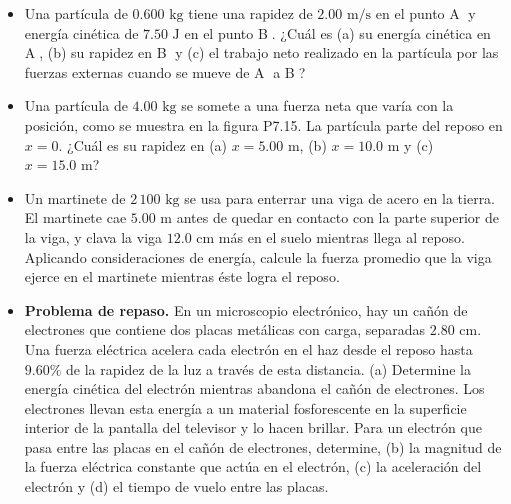 \documentclass[11pt,a4paper]{article}
\begin{document}
\begin{itemize}
    \item[\textbf{21.}] Una partícula de $0.600 \text{ kg}$ tiene una rapidez de $2.00 \text{ m/s}$ en el punto \textcircled{A} y energía cinética de $7.50 \text{ J}$ en el punto \textcircled{B}. ¿Cuál es (a) su energía cinética en \textcircled{A}, (b) su rapidez en \textcircled{B} y (c) el trabajo neto realizado en la partícula por las fuerzas externas cuando se mueve de \textcircled{A} a \textcircled{B}?
    \vspace*{6cm}

    \item[\textbf{22.}] Una partícula de $4.00 \text{ kg}$ se somete a una fuerza neta que varía con la posición, como se muestra en la figura P7.15. La partícula parte del reposo en $x = 0$. ¿Cuál es su rapidez en (a) $x = 5.00 \text{ m}$, (b) $x = 10.0 \text{ m}$ y (c) $x = 15.0 \text{ m}$?
    \vspace*{6cm}

    \item[\textbf{23.}] Un martinete de $2\,100 \text{ kg}$ se usa para enterrar una viga de acero en la tierra. El martinete cae $5.00 \text{ m}$ antes de quedar en contacto con la parte superior de la viga, y clava la viga $12.0 \text{ cm}$ más en el suelo mientras llega al reposo. Aplicando consideraciones de energía, calcule la fuerza promedio que la viga ejerce en el martinete mientras éste logra el reposo.
    \vspace*{6cm}

    \item[\textbf{24.}] \textbf{Problema de repaso.} En un microscopio electrónico, hay un cañón de electrones que contiene dos placas metálicas con carga, separadas $2.80 \text{ cm}$. Una fuerza eléctrica acelera cada electrón en el haz desde el reposo hasta $9.60\%$ de la rapidez de la luz a través de esta distancia. (a) Determine la energía cinética del electrón mientras abandona el cañón de electrones. Los electrones llevan esta energía a un material fosforescente en la superficie interior de la pantalla del televisor y lo hacen brillar. Para un electrón que pasa entre las placas en el cañón de electrones, determine, (b) la magnitud de la fuerza eléctrica constante que actúa en el electrón, (c) la aceleración del electrón y (d) el tiempo de vuelo entre las placas.
    \vspace*{7cm}
\end{itemize}

\newpage
\end{document}
